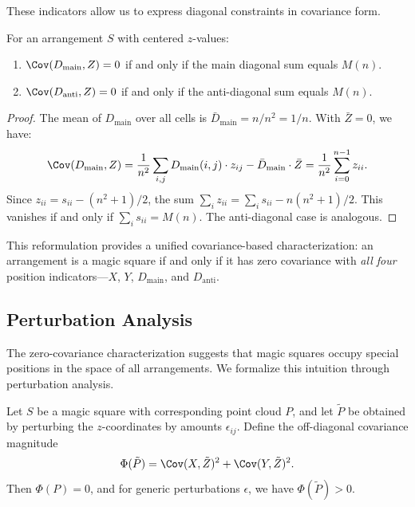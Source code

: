 These indicators allow us to express diagonal constraints in covariance form.

\begin{proposition}
\label{prop:diagonal_cov}
For an arrangement $S$ with centered $z$-values:
\begin{enumerate}
\item $\Cov(D_{\mathrm{main}}, Z) = 0$ if and only if the main diagonal sum equals $M(n)$.
\item $\Cov(D_{\mathrm{anti}}, Z) = 0$ if and only if the anti-diagonal sum equals $M(n)$.
\end{enumerate}
\end{proposition}

\begin{proof}
The mean of $D_{\mathrm{main}}$ over all cells is $\bar{D}_{\mathrm{main}} = n/n^2 = 1/n$.
With $\bar{Z} = 0$, we have:
\[
\Cov(D_{\mathrm{main}}, Z) = \frac{1}{n^2} \sum_{i,j} D_{\mathrm{main}}(i,j) \cdot z_{ij} - \bar{D}_{\mathrm{main}} \cdot \bar{Z}
= \frac{1}{n^2} \sum_{i=0}^{n-1} z_{ii}.
\]
Since $z_{ii} = s_{ii} - (n^2+1)/2$, the sum $\sum_i z_{ii} = \sum_i s_{ii} - n(n^2+1)/2$.
This vanishes if and only if $\sum_i s_{ii} = M(n)$. The anti-diagonal case is analogous.
\end{proof}

This reformulation provides a unified covariance-based characterization:
an arrangement is a magic square if and only if it has zero covariance with 
\emph{all four} position indicators---$X$, $Y$, $D_{\mathrm{main}}$, and $D_{\mathrm{anti}}$.

\subsection{Perturbation Analysis}
\label{sec:perturbation}

The zero-covariance characterization suggests that magic squares occupy special positions 
in the space of all arrangements.
We formalize this intuition through perturbation analysis.

\begin{proposition}
\label{prop:local_opt}
Let $S$ be a magic square with corresponding point cloud $P$, 
and let $\tilde{P}$ be obtained by perturbing the $z$-coordinates by amounts $\epsilon_{ij}$.
Define the off-diagonal covariance magnitude
\[
\Phi(\tilde{P}) = \Cov(X, \tilde{Z})^2 + \Cov(Y, \tilde{Z})^2.
\]
Then $\Phi(P) = 0$, and for generic perturbations $\epsilon$, we have $\Phi(\tilde{P}) > 0$.
\end{proposition}

